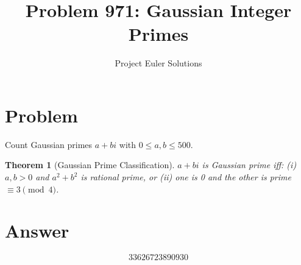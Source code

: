 \documentclass[11pt]{article}
\title{Problem 971: Gaussian Integer Primes}
\author{Project Euler Solutions}
\date{}
\newtheorem{theorem}{Theorem}
\begin{document}
\maketitle
\section{Problem}
Count Gaussian primes $a+bi$ with $0 \le a,b \le 500$.
\begin{theorem}[Gaussian Prime Classification]
$a+bi$ is Gaussian prime iff: (i) $a,b>0$ and $a^2+b^2$ is rational prime, or (ii) one is 0 and the other is prime $\equiv 3 \pmod{4}$.
\end{theorem}
\section{Answer}

\[
\boxed{33626723890930}
\]
\end{document}
